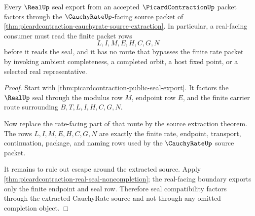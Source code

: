 \begin{theorem}
\label{thm:picardcontraction-cauchyrate-real-seal-compatibility}
Every $\RealUp$ seal export from an accepted $\PicardContractionUp$ packet factors through the $\CauchyRateUp$-facing source packet of \autoref{thm:picardcontraction-cauchyrate-source-extraction}. In particular, a real-facing consumer must read the finite packet rows
$$
L,I,M,E,H,C,G,N
$$
before it reads the seal, and it has no route that bypasses the finite rate packet by invoking ambient completeness, a completed orbit, a host fixed point, or a selected real representative.
\end{theorem}
\begin{proof}
Start with \autoref{thm:picardcontraction-public-seal-export}. It factors the $\RealUp$ seal through the modulus row $M$, endpoint row $E$, and the finite carrier route surrounding $B,T,L,I,H,C,G,N$.

Now replace the rate-facing part of that route by the source extraction theorem. The rows $L,I,M,E,H,C,G,N$ are exactly the finite rate, endpoint, transport, continuation, package, and naming rows used by the $\CauchyRateUp$ source packet.

It remains to rule out escape around the extracted source. Apply \autoref{thm:picardcontraction-real-seal-noncompletion}; the real-facing boundary exports only the finite endpoint and seal row. Therefore seal compatibility factors through the extracted CauchyRate source and not through any omitted completion object.
\end{proof}

